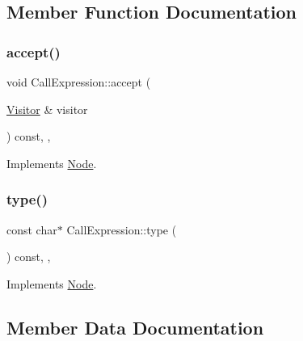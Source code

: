 \subsection{Member Function Documentation}
\mbox{\label{struct_call_expression_a5be626b61944a97f2a6015b632432513}} 
\subsubsection{\texorpdfstring{accept()}{accept()}}
{\footnotesize\ttfamily void Call\+Expression\+::accept (\begin{DoxyParamCaption}\item[{\hyperlink{struct_visitor}{Visitor} \&}]{visitor }\end{DoxyParamCaption}) const\hspace{0.3cm}{\ttfamily [inline]}, {\ttfamily [override]}, {\ttfamily [virtual]}}



Implements \hyperlink{struct_node_a10bd7af968140bbf5fa461298a969c71}{Node}.

\mbox{\label{struct_call_expression_ae2891106618133745e00ac92a6b6b4fd}} 
\subsubsection{\texorpdfstring{type()}{type()}}
{\footnotesize\ttfamily const char$\ast$ Call\+Expression\+::type (\begin{DoxyParamCaption}{ }\end{DoxyParamCaption}) const\hspace{0.3cm}{\ttfamily [inline]}, {\ttfamily [override]}, {\ttfamily [virtual]}}



Implements \hyperlink{struct_node_a82f29420d0a38efcc370352528e94e9b}{Node}.



\subsection{Member Data Documentation}
\mbox{\label{struct_call_expression_ad2dad57df529ef1ef06b43cd438598bd}} 
